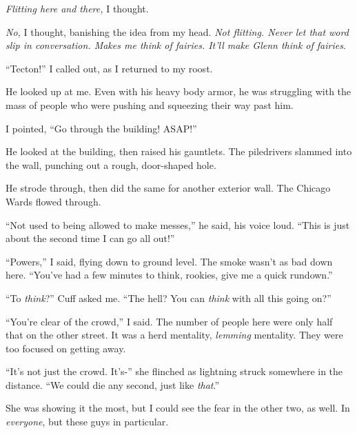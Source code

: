 \emph{Flitting here and there, }I thought.



\emph{No,} I thought, banishing the idea from my head.  \emph{Not flitting.  Never let that word slip in conversation.  Makes me think of fairies.  It'll make Glenn think of fairies}.



``Tecton!'' I called out, as I returned to my roost.



He looked up at me.  Even with his heavy body armor, he was struggling with the mass of people who were pushing and squeezing their way past him.



I pointed, ``Go through the building!  ASAP!''



He looked at the building, then raised his gauntlets.  The piledrivers slammed into the wall, punching out a rough, door-shaped hole.



He strode through, then did the same for another exterior wall.  The Chicago Wards flowed through.



``Not used to being allowed to make messes,'' he said, his voice loud.  ``This is just about the second time I can go all out!''



``Powers,'' I said, flying down to ground level.  The smoke wasn't as bad down here.  ``You've had a few minutes to think, rookies, give me a quick rundown.''



``To \emph{think}?'' Cuff asked me.  ``The hell?  You can \emph{think} with all this going on?''



``You're clear of the crowd,'' I said.  The number of people here were only half that on the other street.  It was a herd mentality, \emph{lemming} mentality.  They were too focused on getting away.



``It's not just the crowd.  It's-'' she flinched as lightning struck somewhere in the distance.  ``We could die any second, just like \emph{that}.''



She was showing it the most, but I could see the fear in the other two, as well.  In \emph{everyone}, but these guys in particular.




